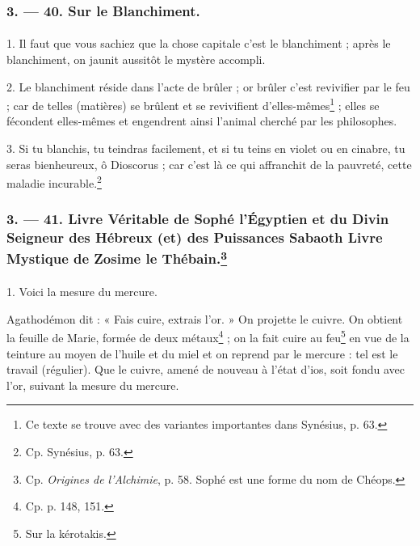 \documentclass[a4paper, 11pt, oneside, polutonikogreek, french]{article}
\begin{document}
\bigskip
\centerline{\EightStarTaper}
\centerline{\EightStarTaper\EightStarTaper}
\bigskip

\subsubsection{3. --- 40. Sur le Blanchiment.}
\paragraph{}
1. Il faut que vous sachiez que la chose capitale c'est le blanchiment ; après le blanchiment, on jaunit aussitôt le mystère accompli.

2. Le blanchiment réside dans l'acte de brûler ; or brûler c'est revivifier par le feu ; car de telles (matières) se brûlent et se revivifient d'elles-mêmes\footnote{Ce texte se trouve avec des variantes importantes dans Synésius, p. 63.} ; elles se fécondent elles-mêmes et engendrent ainsi l'animal cherché par les philosophes.

3. Si tu blanchis, tu teindras facilement, et si tu teins en violet ou en cinabre, tu seras bienheureux, ô Dioscorus ; car c'est là ce qui affranchit de la pauvreté, cette maladie incurable.\footnote{Cp. Synésius, p. 63.}

\bigskip
\centerline{\EightStarTaper}
\centerline{\EightStarTaper\EightStarTaper}
\bigskip

\subsubsection[3. --- 41. Livre Véritable de Sophé l'Égyptien et du Divin Seigneur des Hébreux (et) des Puissances Sabaoth Livre Mystique de Zosime le Thébain.]{3. --- 41. Livre Véritable de Sophé l'Égyptien et du Divin Seigneur des Hébreux (et) des Puissances Sabaoth Livre Mystique de Zosime le Thébain.\footnote{Cp. \emph{Origines de l'Alchimie}, p. 58. Sophé est une forme du nom de Chéops.}}
\paragraph{}
1. Voici la mesure du mercure.

Agathodémon dit : « Fais cuire, extrais l'or. » On projette le cuivre. On obtient la feuille de Marie, formée de deux métaux\footnote{Cp. p. 148, 151.} ; on la fait cuire au feu\footnote{Sur la kérotakis.} en vue de la teinture au moyen de l'huile et du miel et on reprend par le mercure : tel est le travail (régulier). Que le cuivre, amené de nouveau à l'état d'ios, soit fondu avec l'or, suivant la mesure du mercure.
\end{document}
